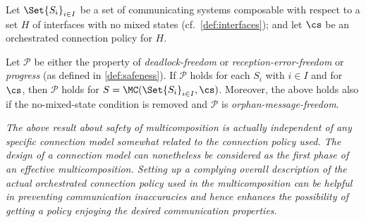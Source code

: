 \begin{theorem}
\label{th:paisafenesse}
 Let $\Set{S_i}_{i\in I}$ be a set of communicating systems composable with respect to a set
 $H$ %
 of interfaces with no mixed states (cf.~\cref{def:interfaces}); and
let $\cs$ be an orchestrated connection policy for $H$. 


Let $\mathcal{P}$ be
either the property of {\em deadlock-freedom} or {\em reception-error-freedom} 
or {\em progress}
(as defined in \cref{def:safeness}).
If $\mathcal{P}$ holds for each $S_i$ with $i \in I$ %
and for $\cs$, 
then $\mathcal{P}$ holds for $S  = \MC(\Set{S_i}_{i\in I}, \cs)$.
% 
Moreover, the above holds also if the no-mixed-state condition is removed and
$\mathcal{P}$ is {\em orphan-message-freedom}.
\end{theorem}


\begin{remark}
{\em
 The above result about safety of multicomposition is actually independent of 
 any specific connection model somewhat related to the connection policy used. 
 The design of a connection model can nonetheless be considered as the first phase of
 an effective multicomposition. Setting up a complying overall description of the actual
 orchestrated connection policy used in the multicomposition can be helpful in
 preventing communication inaccuracies and hence enhances the possibility of getting a policy enjoying the desired communication properties.
\finex
}
\end{remark}


